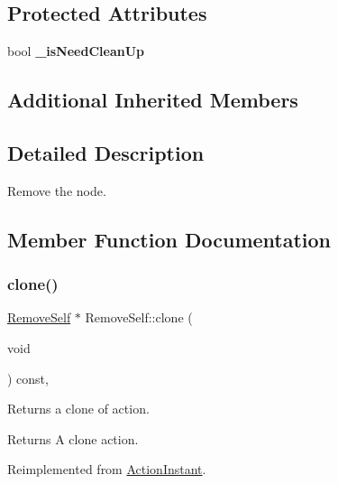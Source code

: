 \subsection*{Protected Attributes}
\begin{DoxyCompactItemize}
\item 
\mbox{\label{classRemoveSelf_af0494c73ad84eafcf70c4d90216743ee}} 
bool {\bfseries \+\_\+is\+Need\+Clean\+Up}
\end{DoxyCompactItemize}
\subsection*{Additional Inherited Members}


\subsection{Detailed Description}
Remove the node. 

\subsection{Member Function Documentation}
\mbox{\label{classRemoveSelf_abfb9c51cb63ea17adfdfc32dbe734984}} 
\subsubsection{\texorpdfstring{clone()}{clone()}\hspace{0.1cm}{\footnotesize\ttfamily [1/2]}}
{\footnotesize\ttfamily \hyperlink{classRemoveSelf}{Remove\+Self} $\ast$ Remove\+Self\+::clone (\begin{DoxyParamCaption}\item[{void}]{ }\end{DoxyParamCaption}) const\hspace{0.3cm}{\ttfamily [override]}, {\ttfamily [virtual]}}

Returns a clone of action.

\begin{DoxyReturn}{Returns}
A clone action. 
\end{DoxyReturn}


Reimplemented from \hyperlink{classActionInstant_adb76fc6f006098109e8256210cbd8cc0}{Action\+Instant}.

\mbox{\label{classRemoveSelf_a5e60946cc58193e98d2293c42e1c6d9d}} 
